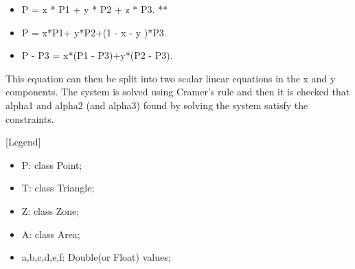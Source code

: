 \begin{itemize}
	\item P = x * P1 + y * P2 + z * P3. **
	\item P = x*P1+ y*P2+(1 - x - y )*P3.
	\item P - P3 = x*(P1 - P3)+y*(P2 - P3).
\end{itemize}

This equation can then be split into two scalar linear equations in the x and y components. The system is solved using Cramer's rule and then it is checked that alpha1 and alpha2 (and alpha3) found by solving the system satisfy the constraints.

[Legend]
\begin{itemize}
	\item P: class Point;
	\item T: class Triangle;
	\item Z:  class Zone;
	\item A: class Area;
	\item a,b,c,d,e,f: Double(or Float) values;
\end{itemize}


